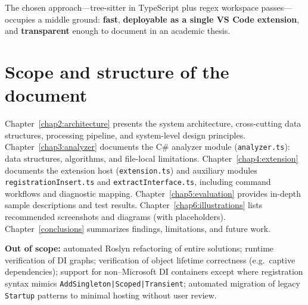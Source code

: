 The chosen approach---tree-sitter in TypeScript plus regex workspace passes---occupies a middle ground: \textbf{fast}, \textbf{deployable as a single VS Code extension}, and \textbf{transparent} enough to document in an academic thesis.

\section{Scope and structure of the document}
\label{chap1:structure}

Chapter~\ref{chap2:architecture} presents the system architecture, cross-cutting data structures, processing pipeline, and system-level design principles. Chapter~\ref{chap3:analyzer} documents the C\# analyzer module (\texttt{analyzer.ts}): data structures, algorithms, and file-local limitations. Chapter~\ref{chap4:extension} documents the extension host (\texttt{extension.ts}) and auxiliary modules \texttt{registrationInsert.ts} and \texttt{extractInterface.ts}, including command workflows and diagnostic mapping. Chapter~\ref{chap5:evaluation} provides in-depth sample descriptions and test results. Chapter~\ref{chap6:illustrations} lists recommended screenshots and diagrams (with placeholders). Chapter~\ref{conclusions} summarizes findings, limitations, and future work.

\textbf{Out of scope:} automated Roslyn refactoring of entire solutions; runtime verification of DI graphs; verification of object lifetime correctness (e.g.\ captive dependencies); support for non--Microsoft DI containers except where registration syntax mimics \texttt{AddSingleton|Scoped|Transient}; automated migration of legacy \texttt{Startup} patterns to minimal hosting without user review.
